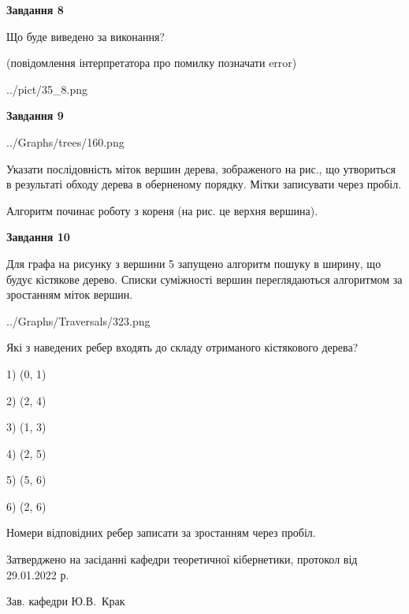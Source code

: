 \documentclass[12pt, ukrainian]{article}
\begin{document}
{\begin {large}
{\begin {center}\textbf{Завдання 8}\end {center}}\par
Що буде виведено за виконання?\par
 (повідомлення інтерпретатора про помилку позначати error)\par
\begin{center}
	{../pict/35_8.png}
\end{center}
\newpage

{\begin {center}\textbf{Завдання 9}\end {center}}\par

\begin{center}
	{../Graphs/trees/160.png}
\end{center}
Указати послідовність міток вершин дерева, зображеного на рис., що утвориться в результаті обходу дерева в оберненому порядку. Мітки записувати через пробіл.\par Алгоритм починає роботу з кореня (на рис. це верхня вершина).\par
\newpage

{\begin {center}\textbf{Завдання 10}\end {center}}\par
Для графа на рисунку з вершини 5 запущено алгоритм пошуку в ширину, що будує кістякове дерево. Списки суміжності вершин переглядаються алгоритмом за зростанням міток вершин.\par
\begin{center}
	{../Graphs/Traversals/323.png}
\end{center}
\par Які з наведених ребер входять до складу отриманого кістякового дерева?\par
1) (0, 1)\par
2) (2, 4)\par
3) (1, 3)\par
4) (2, 5)\par
5) (5, 6)\par
6) (2, 6)\par
{\vskip 15pt} Номери відповідних ребер записати за зростанням через пробіл.\par
\newpage


\end {large}
}
{\smallskip \begin {small} Затверджено на засіданні кафедри теоретичної кібернетики, протокол  від   29.01.2022 р.\par\smallskip\smallskip
{\parbox {6.5 cm}{Зав. кафедри \dotfill Ю.В.~Крак}} \end{small}}
\end{document}

